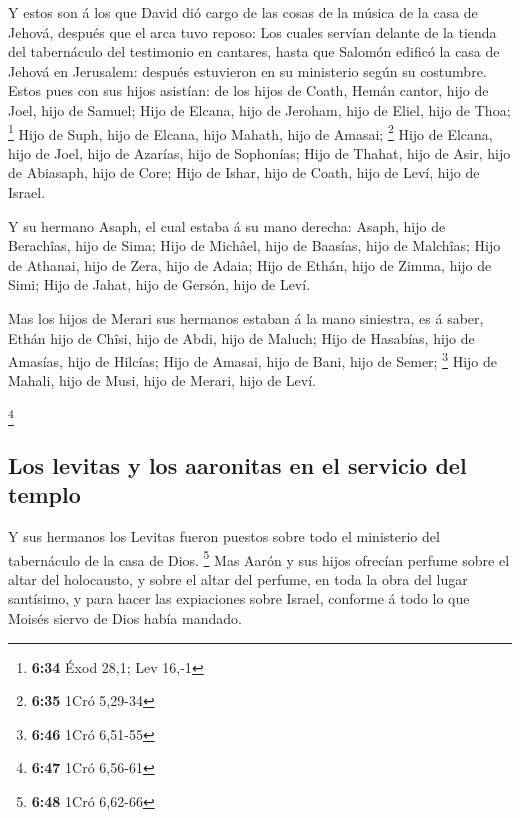  Y estos son á los que David dió cargo de las cosas de la
música de la casa de Jehová, después que el arca tuvo reposo:
 Los cuales servían delante de la tienda del tabernáculo
del testimonio en cantares, hasta que Salomón edificó la casa de Jehová
en Jerusalem: después estuvieron en su ministerio según su costumbre.
 Estos pues con sus hijos asistían: de los hijos de
Coath, Hemán cantor, hijo de Joel, hijo de Samuel;  Hijo
de Elcana, hijo de Jeroham, hijo de Eliel, hijo de Thoa; \footnote{\textbf{6:34}
  Éxod 28,1; Lev 16,-1}  Hijo de Suph, hijo de Elcana,
hijo Mahath, hijo de Amasai; \footnote{\textbf{6:35} 1Cró 5,29-34}
 Hijo de Elcana, hijo de Joel, hijo de Azarías, hijo de
Sophonías;  Hijo de Thahat, hijo de Asir, hijo de
Abiasaph, hijo de Core;  Hijo de Ishar, hijo de Coath,
hijo de Leví, hijo de Israel.

 Y su hermano Asaph, el cual estaba á su mano derecha:
Asaph, hijo de Berachîas, hijo de Sima;  Hijo de Michâel,
hijo de Baasías, hijo de Malchîas;  Hijo de Athanai, hijo
de Zera, hijo de Adaia;  Hijo de Ethán, hijo de Zimma,
hijo de Simi;  Hijo de Jahat, hijo de Gersón, hijo de
Leví.

 Mas los hijos de Merari sus hermanos estaban á la mano
siniestra, es á saber, Ethán hijo de Chîsi, hijo de Abdi, hijo de
Maluch;  Hijo de Hasabías, hijo de Amasías, hijo de
Hilcías;  Hijo de Amasai, hijo de Bani, hijo de Semer;
\footnote{\textbf{6:46} 1Cró 6,51-55}  Hijo de Mahali,
hijo de Musi, hijo de Merari, hijo de Leví.

\footnote{\textbf{6:47} 1Cró 6,56-61}

\hypertarget{los-levitas-y-los-aaronitas-en-el-servicio-del-templo}{%
\subsection{Los levitas y los aaronitas en el servicio del
templo}\label{los-levitas-y-los-aaronitas-en-el-servicio-del-templo}}

 Y sus hermanos los Levitas fueron puestos sobre todo el
ministerio del tabernáculo de la casa de Dios. \footnote{\textbf{6:48}
  1Cró 6,62-66}  Mas Aarón y sus hijos ofrecían perfume
sobre el altar del holocausto, y sobre el altar del perfume, en toda la
obra del lugar santísimo, y para hacer las expiaciones sobre Israel,
conforme á todo lo que Moisés siervo de Dios había mandado.

